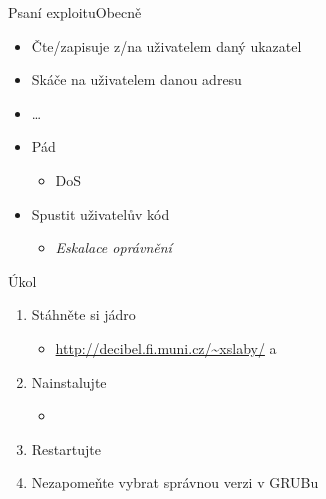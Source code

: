 \begin{frame}{Psaní exploitu}{Obecně}

  \begin{itemize}
    \item Čte/zapisuje z/na uživatelem daný ukazatel
    \item Skáče na uživatelem danou adresu
    \item \dots
  \end{itemize}

  \pause
  \bigskip

  \begin{itemize}
    \item Pád
    \begin{itemize}
      \item DoS
    \end{itemize}

    \item Spustit uživatelův kód
    \begin{itemize}
      \item \emph{Eskalace oprávnění}
    \end{itemize}
  \end{itemize}

\end{frame}

\begin{frame}{Úkol}

  \begin{enumerate}
    \item Stáhněte si jádro
    \begin{itemize}
      \item \url{http://decibel.fi.muni.cz/~xslaby/} a
    \end{itemize}

    \item Nainstalujte
    \begin{itemize}
      \item {}
    \end{itemize}

    \item Restartujte
    \item Nezapomeňte vybrat správnou verzi v GRUBu
  \end{enumerate}

\end{frame}

